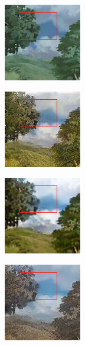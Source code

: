 \documentclass[conference]{IEEEtran}
\begin{document}
\begin{figure}[!htb]
\begin{center}
     \begin{subfigure}[normal]{0.2\textwidth}
         \label{Fig2 input}
         \includegraphics[scale = 0.7]{zooming_picture/in_x.jpg}
     \end{subfigure}
     \hspace{0.0001mm}
     \begin{subfigure}[normal]{0.2\textwidth}
         \label{subfig:B}
         \includegraphics[scale = 0.7]{zooming_picture/our_x.jpg}
     \end{subfigure}
     \hspace{0.0001mm}
     \begin{subfigure}[normal]{0.2\textwidth}
         \label{subfig:C}
         \includegraphics[scale = 0.7]{zooming_picture/unit_x.jpg}
     \end{subfigure}
     \hspace{0.0001mm}
     \begin{subfigure}[normal]{0.2\textwidth}
         \label{subfig:D}
         \includegraphics[scale = 0.7]{zooming_picture/sgan_x.jpg}

\end{subfigure}
\end{center}
\end{figure}
\end{document}
